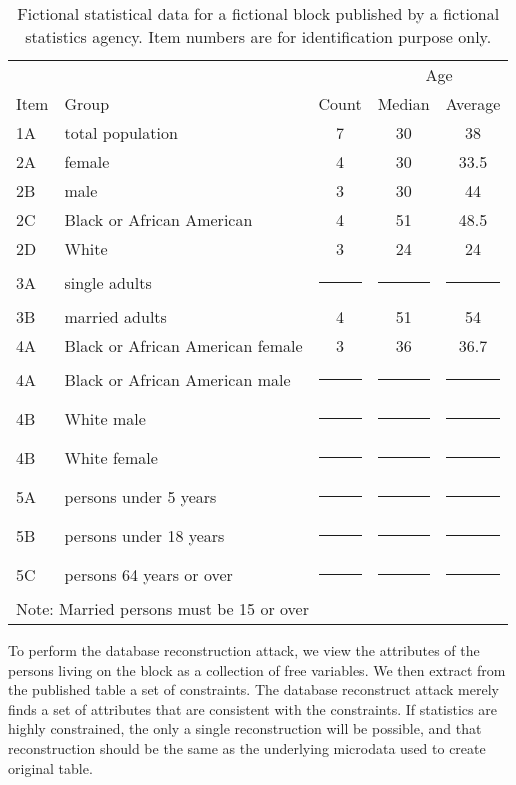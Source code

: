 \documentclass[runningheads]{llncs}
\begin{document}
\newcommand{\cens}{\multicolumn{1}{c|}{\rule{6mm}{3mm}}}
\begin{table}
\caption{Fictional statistical data for a fictional block published by
  a fictional statistics agency. Item numbers are for identification
  purpose only.\label{fictional}}
\begin{center}
\begin{tabular}{l|l|c|c|c|}
     &                           &       & \multicolumn{2}{|c|}{Age} \\
Item & Group                     & Count & Median & Average \\
\hline
  1A & total population          & 7     &  30    & 38 \\
\hline
  2A & female                    & 4     &  30    & 33.5 \\
  2B & male                      & 3     &  30    & 44 \\
  2C & Black or African American & 4     &  51    & 48.5 \\
  2D & White                     & 3     &  24    & 24 \\
\hline
  3A & single adults             & \cens & \cens  & \cens \\
  3B & married adults            & 4     & 51     & 54 \\
\hline
  4A & Black or African American female              & 3     & 36     & 36.7 \\
  4A & Black or African American male                & \cens & \cens  & \cens \\
  4B & White male                & \cens & \cens  & \cens \\
  4B & White female              & \cens & \cens  & \cens \\
\hline
  5A & persons under 5 years     & \cens & \cens  & \cens \\
  5B & persons under 18 years    & \cens & \cens  & \cens \\
  5C & persons 64 years or over  & \cens & \cens  & \cens \\
\hline
\multicolumn{5}{l}{Note: Married persons must be 15 or over}
\end{tabular}
\end{center}
\end{table}

To perform the database reconstruction attack, we view the attributes
of the persons living on the block as a collection of 
free variables. We then extract from the published table a set of
constraints. The database reconstruct attack merely finds a set of
attributes that are consistent with the constraints. If statistics are
highly constrained, the only a single reconstruction will be
possible, and that reconstruction should be the same as the underlying
microdata used to create original table.
\end{document}

